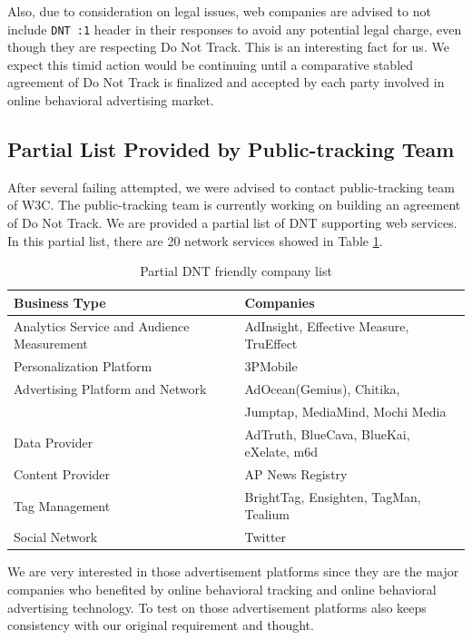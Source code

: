 \documentclass{sig-alternate}
\begin{document}
Also, due to consideration on legal issues, web companies are advised to not include \verb|DNT :1| header in their responses to avoid any potential legal charge, even though they are respecting Do Not Track. This is an interesting fact for us. We expect this timid action would be continuing until a comparative stabled agreement of Do Not Track is finalized and accepted by each party involved in online behavioral advertising market.

\subsection{Partial List Provided by Public-tracking Team}

After several failing attempted, we were advised to contact public-tracking team of W3C. The public-tracking team is currently working on building an agreement of Do Not Track. We are provided a partial list of DNT supporting web services. In this partial list, there are 20 network services showed in Table \ref{table:dntlist}.

\begin{table}
\footnotesize
\begin{tabular}{ll}
\toprule
Business Type&Companies\\
\midrule
Analytics Service and Audience Measurement&AdInsight, Effective Measure, TruEffect\\ \hline
\addlinespace
Personalization Platform&3PMobile\\ \hline
\addlinespace
Advertising Platform and Network&AdOcean(Gemius), Chitika,\\& Jumptap, MediaMind, Mochi Media\\ \hline
\addlinespace
Data Provider&AdTruth, BlueCava, BlueKai, eXelate, m6d\\ \hline
\addlinespace
Content Provider&AP News Registry\\ \hline
\addlinespace
Tag Management&BrightTag, Ensighten, TagMan, Tealium\\ \hline
\addlinespace
Social Network&Twitter\\
\bottomrule
\end{tabular}
\caption{Partial DNT friendly company list}
\label{table:dntlist}
\end{table}

We are very interested in those advertisement platforms since they are the major companies who benefited by online behavioral tracking and online behavioral advertising technology. To test on those advertisement platforms also keeps consistency with our original requirement and thought.
\end{document}
